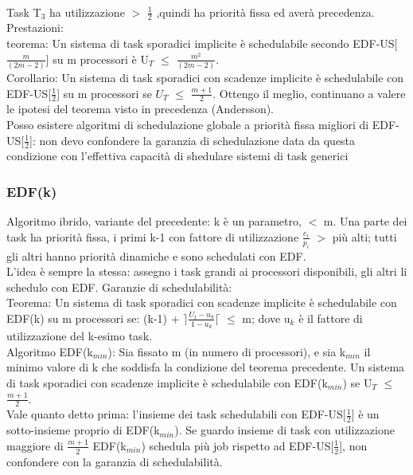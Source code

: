 \documentclass[12pt, oneside]{extbook}
\begin{document}
\\Task T$_3$ ha utilizzazione $>$ $\frac{1}{2}$ ,quindi ha priorità fissa ed averà precedenza.\\ Prestazioni:\\ teorema: Un sistema di task sporadici implicite è  schedulabile secondo EDF-US[$\frac{m}{(2m-2)}$] su m processori è U$_T$ $\leq$ $\frac{m^2}{(2m-2)}$.\\ Corollario: Un sistema di task sporadici con scadenze implicite è schedulabile con EDF-US[$\frac{1}{2}$] su m processori se $U_T$ $\leq$ $\frac{m + 1}{2}$. Ottengo il meglio, continuano a valere le ipotesi del teorema visto in precedenza (Andersson).\\ Posso esistere algoritmi di schedulazione globale a priorità fissa migliori di EDF-US[$\frac{1}{2}$]: non devo confondere la garanzia di schedulazione data da questa condizione con l'effettiva capacità di shedulare sistemi di task generici
\subsubsection{EDF(k)}
Algoritmo ibrido, variante del precedente: k è un parametro, $<$ m. Una parte dei task ha priorità fissa, i primi k-1 con fattore di utilizzazione $\frac{e_i}{p_i}$ $>$ più alti; tutti gli altri hanno priorità dinamiche e sono schedulati con EDF.\\ L'idea è sempre la stessa: assegno i task grandi ai processori disponibili, gli altri li schedulo con EDF. Garanzie di schedulabilità:\\ Teorema: Un sistema di task sporadici con scadenze implicite è schedulabile con EDF(k) su m processori se: (k-1) + $\rceil \frac{U_t - u_k}{1 - u_k}\lceil$ $\leq$ m; dove u$_{k}$ è  il fattore di utilizzazione del k-esimo task.\\ Algoritmo EDF(k$_{min}$): Sia fissato m (in numero di processori), e sia k$_{min}$ il minimo valore di k che soddisfa la condizione del teorema precedente. Un sistema di task sporadici con scadenze implicite è schedulabile con EDF(k$_{min}$) se U$_T$ $\leq$ $\frac{m+1}{2}$.\\ Vale quanto detto prima: l'insieme dei task schedulabili con EDF-US[$\frac{1}{2}$] è un sotto-insieme proprio di EDF(k$_{min}$). Se guardo insieme di task con utilizzazione maggiore di $\frac{m+1}{2}$ EDF(k$_{min}$) schedula più job rispetto ad EDF-US[$\frac{1}{2}$], non confondere con la garanzia di schedulabilità.
\end{document}
